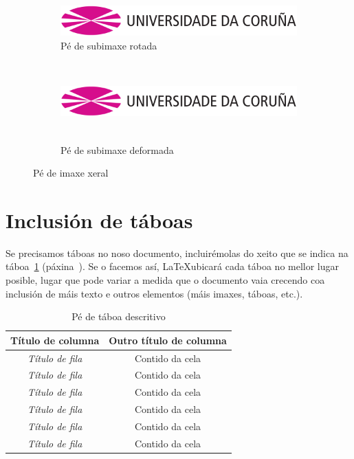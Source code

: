 \begin{figure}[hp!]
  \centering
  \begin{subfigure}[c]{0.3\textwidth}
    \includegraphics[angle=45,width=\textwidth]{imaxes/udc.png}
    \caption{Pé de subimaxe rotada}
    \label{fig:subfigura-rotada}
  \end{subfigure}
  \hspace{0.1\textwidth}
  \begin{subfigure}[c]{0.3\textwidth}
    \includegraphics[width=\textwidth,height=3cm]{imaxes/udc.png}
    \caption{Pé de subimaxe deformada}
    \label{fig:subfigura-deformada}
  \end{subfigure}
  \caption{Pé de imaxe xeral}
  \label{fig:exemplo-subfiguras}
\end{figure}

\section{Inclusión de táboas}

Se precisamos táboas no noso documento, incluirémolas do xeito que se
indica na táboa~\ref{tab:exemplo} (páxina~\pageref{tab:exemplo}). Se
o facemos así, \LaTeX ubicará cada táboa no mellor lugar posible,
lugar que pode variar a medida que o documento vaia crecendo coa
inclusión de máis texto e outros elementos (máis imaxes, táboas,
etc.).

\begin{table}[hp!]
  \centering
  \begin{tabular}{c|c}
  \rowcolor{udcpink!25}
  \textbf{Título de columna} & \textbf{Outro título de columna} \\\hline
  \textit{Título de fila} & Contido da cela \\
  \textit{Título de fila} & Contido da cela \\
  \textit{Título de fila} & Contido da cela \\
  \textit{Título de fila} & Contido da cela \\
  \textit{Título de fila} & Contido da cela \\
  \textit{Título de fila} & Contido da cela \\
  \end{tabular}
  \caption{Pé de táboa descritivo}
  \label{tab:exemplo}
\end{table}

